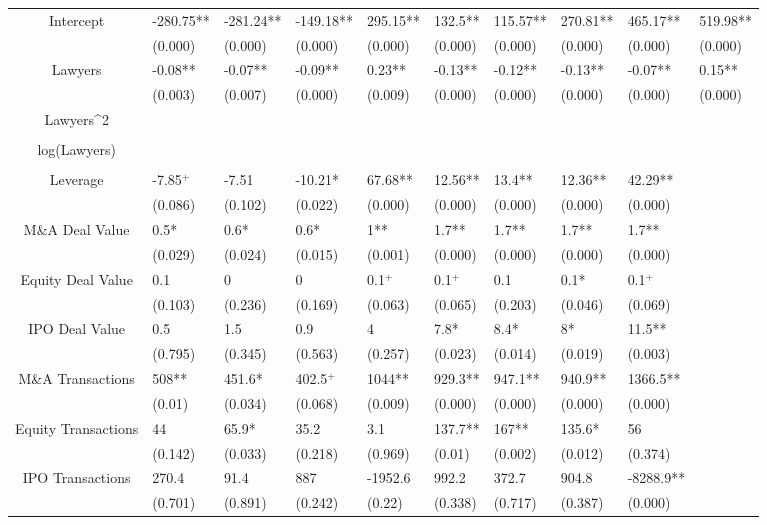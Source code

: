 \documentclass{article}
\begin{document}
\begin{table}[H]
\begin{tabular}{|clllllllll|}
Intercept & -280.75** & -281.24** & -149.18** & 295.15** & 132.5** & 115.57** & 270.81** & 465.17** & 519.98** \\
   & (0.000) & (0.000) & (0.000) & (0.000) & (0.000) & (0.000) & (0.000) & (0.000) & (0.000) \\
  Lawyers & -0.08** & -0.07** & -0.09** & 0.23** & -0.13** & -0.12** & -0.13** & -0.07** & 0.15** \\
   & (0.003) & (0.007) & (0.000) & (0.009) & (0.000) & (0.000) & (0.000) & (0.000) & (0.000) \\
  Lawyers^2 &  &  &  &  &  &  &  &  &  \\
   &  &  &  &  &  &  &  &  &  \\
  log(Lawyers) &  &  &  &  &  &  &  &  &  \\
   &  &  &  &  &  &  &  &  &  \\
  Leverage & -7.85$^{+}$ & -7.51 & -10.21* & 67.68** & 12.56** & 13.4** & 12.36** & 42.29** &  \\
   & (0.086) & (0.102) & (0.022) & (0.000) & (0.000) & (0.000) & (0.000) & (0.000) &  \\
  M\&A Deal Value & 0.5* & 0.6* & 0.6* & 1** & 1.7** & 1.7** & 1.7** & 1.7** &  \\
   & (0.029) & (0.024) & (0.015) & (0.001) & (0.000) & (0.000) & (0.000) & (0.000) &  \\
  Equity Deal Value & 0.1 & 0 & 0 & 0.1$^{+}$ & 0.1$^{+}$ & 0.1 & 0.1* & 0.1$^{+}$ &  \\
   & (0.103) & (0.236) & (0.169) & (0.063) & (0.065) & (0.203) & (0.046) & (0.069) &  \\
  IPO Deal Value & 0.5 & 1.5 & 0.9 & 4 & 7.8* & 8.4* & 8* & 11.5** &  \\
   & (0.795) & (0.345) & (0.563) & (0.257) & (0.023) & (0.014) & (0.019) & (0.003) &  \\
  M\&A Transactions & 508** & 451.6* & 402.5$^{+}$ & 1044** & 929.3** & 947.1** & 940.9** & 1366.5** &  \\
   & (0.01) & (0.034) & (0.068) & (0.009) & (0.000) & (0.000) & (0.000) & (0.000) &  \\
  Equity Transactions & 44 & 65.9* & 35.2 & 3.1 & 137.7** & 167** & 135.6* & 56 &  \\
   & (0.142) & (0.033) & (0.218) & (0.969) & (0.01) & (0.002) & (0.012) & (0.374) &  \\
  IPO Transactions & 270.4 & 91.4 & 887 & -1952.6 & 992.2 & 372.7 & 904.8 & -8288.9** &  \\
   & (0.701) & (0.891) & (0.242) & (0.22) & (0.338) & (0.717) & (0.387) & (0.000) &  \\

\end{tabular}
\end{table}
\end{document}
